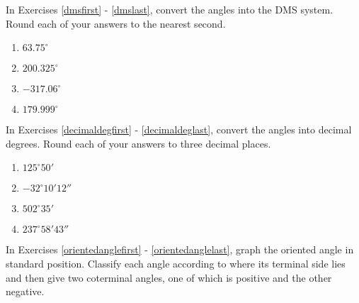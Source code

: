 \documentclass{ximera}
\begin{document}
	\author{Stitz-Zeager}


\label{ExercisesforAppAngles}

In Exercises \ref{dmsfirst} - \ref{dmslast}, convert the angles into the DMS system.  Round each of your answers to the nearest second.

\begin{multicols}{4} 

\begin{enumerate}

\item $63.75^{\circ}$ \label{dmsfirst}
\item $200.325^{\circ}$
\item $-317.06^{\circ}$
\item $179.999^{\circ}$ \label{dmslast}

\setcounter{HW}{\value{enumi}}

\end{enumerate}

\end{multicols}

In Exercises \ref{decimaldegfirst} - \ref{decimaldeglast}, convert the angles into decimal degrees.  Round each of your answers to three decimal places.

\begin{multicols}{4} 

\begin{enumerate}

\setcounter{enumi}{\value{HW}}

\item $125^{\circ} 50'$ \label{decimaldegfirst}
\item $-32^{\circ} 10' 12''$
\item $502^{\circ} 35'$
\item $237^{\circ} 58' 43''$ \label{decimaldeglast}

\setcounter{HW}{\value{enumi}}

\end{enumerate}

\end{multicols}

In Exercises \ref{orientedanglefirst} - \ref{orientedanglelast}, graph the oriented angle in standard position. Classify each angle according to where its terminal side lies and then give two coterminal angles, one of which is positive and the other negative.
\end{document}
